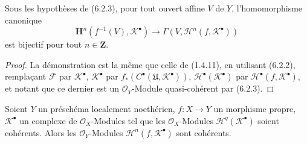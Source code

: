 
\begin{corollary}[6.2.4]
Sous les hypothèses de (6.2.3), pour tout ouvert affine $V$ de $Y$,
l'homomorphisme canonique
\[
  \mathbf H^n(f^{-1}(V),\mathscr K^\bullet)
  \longrightarrow
  \Gamma(V,\mathscr H^n(f,\mathscr K^\bullet))
  \tag{6.2.4.1}\label{III.6.2.4.1.fr}
\]
est bijectif pour tout $n\in\mathbf Z$.
\end{corollary}

\begin{proof}
La démonstration est la même que celle de (1.4.11), en utilisant (6.2.2),
remplaçant $\mathscr F$ par $\mathscr K^\bullet$,
$\mathscr K^\bullet$ par
$f_*(C^\bullet(\mathfrak U,\mathscr K^\bullet))$,
$\mathscr H^\bullet(\mathscr K^\bullet)$ par
$\mathscr H^\bullet(f,\mathscr K^\bullet)$, et notant que ce dernier est un
$\mathscr O_Y$-Module quasi-cohérent par (6.2.3).
\end{proof}

\begin{proposition}[6.2.5]
Soient $Y$ un préschéma localement noethérien, $f:X\to Y$ un morphisme
propre, $\mathscr K^\bullet$ un complexe de $\mathscr O_X$-Modules tel que les
$\mathscr O_X$-Modules $\mathscr H^q(\mathscr K^\bullet)$ soient cohérents.
Alors les $\mathscr O_Y$-Modules $\mathscr H^n(f,\mathscr K^\bullet)$ sont
cohérents.
\end{proposition}

